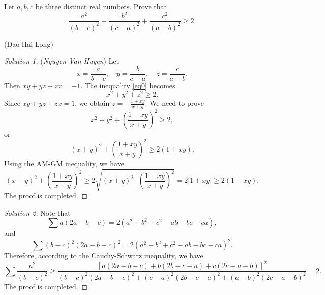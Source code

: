 \documentclass[12pt,a4paper]{book}
\begin{document}
\begin{pro}
Let $a, b, c$ be three distinct real numbers. Prove that
\begin{equation}\label{eq0}
\frac{a^2}{(b-c)^2}+\frac{b^2}{(c-a)^2}+\frac{c^2}{(a-b)^2} \geqslant 2.
\end{equation} 
\begin{flushright}(Dao Hai Long)\end{flushright}
\end{pro}

\begin{proof}[\cmss\problemColor Solution 1]
(\textit{Nguyen Van Huyen}) Let
\[x = \frac{a}{b-c}, \quad y = \frac{b}{c-a}, \quad z = \frac{c}{a-b}.\]
Then $xy+yz+zx=-1$. The inequality \eqref{eq0} becomes
\[x^2+y^2+z^2 \ge 2.\]
Since $xy+yz+zx=1$, we obtain $z = -\frac{1+xy}{x+y}$. We need to prove
\[x^2+y^2+\left(\frac{1+xy}{x+y}\right)^2 \ge 2,\]
or
\[(x+y)^2+\left(\frac{1+xy}{x+y}\right)^2 \ge 2(1+xy).\]
Using the AM-GM inequality, we have
\[(x+y)^2+\left(\frac{1+xy}{x+y}\right)^2 \ge 2\sqrt{(x+y)^2 \cdot \left(\frac{1+xy}{x+y}\right)^2} = 2|1+xy| \ge 2(1+xy).\]
The proof is completed.
\end{proof}

\begin{proof}[\cmss\problemColor Solution 2]
Note that
\[\sum a(2a-b-c)=2(a^2+b^2+c^2-ab-bc-ca),\]
and
\[\sum (b-c)^2(2a-b-c)^2=2(a^2+b^2+c^2-ab-bc-ca)^2.\]
Therefore, according to the Cauchy-Schwarz inequality, we have
\[\sum \frac{a^2}{(b-c)^2} \geqslant \frac{\left[a(2a-b-c)+b(2b-c-a)+c(2c-a-b)\right] ^2}{(b-c)^2(2a-b-c)^2+(c-a)^2(2b-c-a)^2+(a-b)^2(2c-a-b)^2}=2.\]
The proof is completed.
\end{proof}
\end{document}
